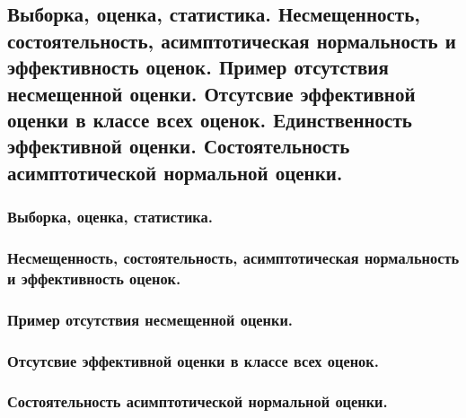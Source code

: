 \subsection{Выборка, оценка, статистика. Несмещенность, состоятельность, асимптотическая нормальность и эффективность оценок. Пример отсутствия несмещенной оценки. Отсутсвие эффективной оценки в классе всех оценок. Единственность эффективной оценки. Состоятельность асимптотической нормальной оценки.}

\subsubsection{Выборка, оценка, статистика.}

\subsubsection{Несмещенность, состоятельность, асимптотическая нормальность и эффективность оценок.}

\subsubsection{Пример отсутствия несмещенной оценки.}

\subsubsection{Отсутсвие эффективной оценки в классе всех оценок.}

\subsubsection{Состоятельность асимптотической нормальной оценки.}
